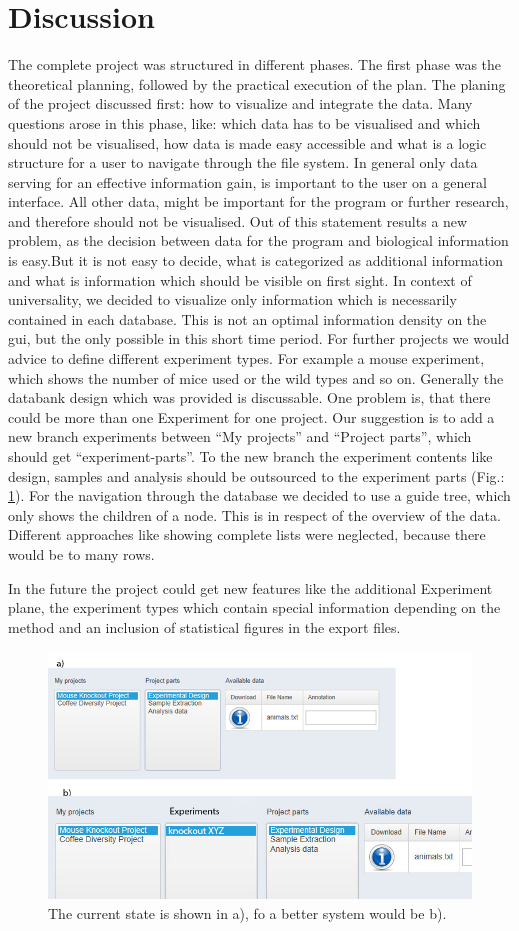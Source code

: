 \documentclass[a4paper, 11pt]{article}
\begin{document}
\section{Discussion}
The complete project was structured in different phases. The first phase was the theoretical planning, followed by the practical execution of the plan. The planing of the project discussed first: how to visualize and integrate the data. Many questions arose in this phase, like: which data has to be visualised and which should not be visualised, how data is made easy accessible and what is a logic structure for a user to navigate through the file system.
In general only data serving for an effective information gain, is important to the user on a general interface. All other data, might be important for the program or further research, and therefore should not be visualised. Out of this statement results a new problem, as the decision between data for the program and biological information is easy.But it is not easy to decide, what is categorized as additional information and what is information which should be visible on first sight. In context of universality, we decided to visualize only information which is necessarily contained in each database. This is not an optimal information density on the gui, but the only possible in this short time period. For further projects we would advice to define different experiment types. For example a mouse experiment, which shows the number of mice used or the wild types and so on.
Generally the databank design which was provided is discussable. One problem is, that there could be more than one Experiment for one project. Our suggestion is to add a new branch experiments between “My projects” and “Project parts”, which should get “experiment-parts”. To the new branch the experiment contents like design, samples and analysis should be outsourced to the experiment parts (Fig.: \ref{fig:better-system}).
For the navigation through the database we decided to use a guide tree, which only shows the children of a node. This is in respect of the overview of the data. Different approaches like showing complete lists were neglected, because there would be to many rows.

In the future the project could get new features like the additional Experiment plane, the experiment types which contain special information depending on the method and an inclusion of statistical figures in the export files.

\begin{figure}[h]
	\includegraphics[scale=2.0]{better-System.png}
	\caption{The current state is shown in a), fo a better system would be b).}
	\label{fig:better-system}
\end{figure}



\clearpage

\end{document}
